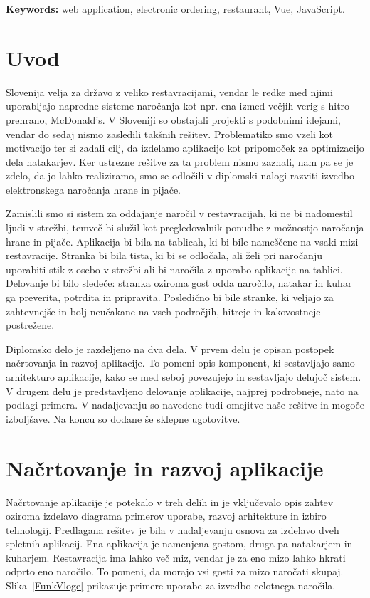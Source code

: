 \documentclass[a4paper, 12pt]{book}
\newcommand{\tkeywordsEn}{web application, electronic ordering, restaurant, Vue, JavaScript}
\newcommand{\clearemptydoublepage}{\newpage{\pagestyle{empty}\cleardoublepage}}
\begin{document}
\noindent\textbf{Keywords:} \tkeywordsEn.
\clearemptydoublepage

\mainmatter
\setcounter{page}{1}
\pagestyle{fancy}
 
\chapter{Uvod}
Slovenija velja za državo z veliko restavracijami, vendar le redke med njimi uporabljajo napredne sisteme naročanja kot npr. ena izmed večjih verig s hitro prehrano, McDonald's. V Sloveniji so obstajali projekti s podobnimi idejami, vendar do sedaj nismo zasledili takšnih rešitev. Problematiko smo vzeli kot motivacijo ter si zadali cilj, da izdelamo aplikacijo kot pripomoček za optimizacijo dela natakarjev. Ker ustrezne rešitve za ta problem nismo zaznali, nam pa se je zdelo, da jo lahko realiziramo, smo se odločili v diplomski nalogi razviti izvedbo elektronskega naročanja hrane in pijače.

Zamislili smo si sistem za oddajanje naročil v restavracijah, ki ne bi nadomestil ljudi v strežbi, temveč bi služil kot pregledovalnik ponudbe z možnostjo naročanja hrane in pijače. Aplikacija bi bila na tablicah, ki bi bile nameščene na vsaki mizi restavracije. Stranka bi bila tista, ki bi se odločala, ali želi pri naročanju uporabiti stik z osebo v strežbi ali bi naročila z uporabo aplikacije na tablici. Delovanje bi bilo sledeče: stranka oziroma gost odda naročilo, natakar in kuhar ga preverita, potrdita in pripravita. Posledično bi bile stranke, ki veljajo za zahtevnejše in bolj neučakane na vseh področjih, hitreje in kakovostneje postrežene. 

Diplomsko delo je razdeljeno na dva dela. V prvem delu je opisan postopek načrtovanja in razvoj aplikacije. To pomeni opis komponent, ki sestavljajo samo arhitekturo aplikacije, kako se med seboj povezujejo in sestavljajo delujoč sistem. V drugem delu je predstavljeno delovanje aplikacije, najprej podrobneje, nato na podlagi primera. V nadaljevanju so navedene tudi omejitve naše rešitve in mogoče izboljšave. Na koncu so dodane še sklepne ugotovitve. 

\chapter{Načrtovanje in razvoj aplikacije}

Načrtovanje aplikacije je potekalo v treh delih in je vključevalo opis zahtev oziroma izdelavo diagrama primerov uporabe, razvoj arhitekture in izbiro tehnologij. Predlagana rešitev je bila v nadaljevanju osnova za izdelavo dveh spletnih aplikacij. Ena aplikacija je namenjena gostom, druga pa natakarjem in kuharjem. Restavracija ima lahko več miz, vendar je za eno mizo lahko hkrati odprto eno naročilo. To pomeni, da morajo vsi gosti za mizo naročati skupaj. Slika~\ref{FunkVloge} prikazuje primere uporabe za izvedbo celotnega naročila. 
\end{document}

